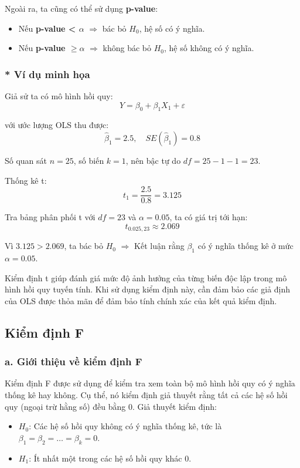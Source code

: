 Ngoài ra, ta cũng có thể sử dụng \textbf{p-value}:

\begin{itemize}
    \item Nếu \textbf{p-value < $\alpha$} $\Rightarrow$ bác bỏ $H_0$, hệ số có ý nghĩa.
    \item Nếu \textbf{p-value $\geq \alpha$} $\Rightarrow$ không bác bỏ $H_0$, hệ số không có ý nghĩa.
\end{itemize}

\subsubsection{* Ví dụ minh họa}

Giả sử ta có mô hình hồi quy:
\begin{equation}
    Y = \beta_0 + \beta_1 X_1 + \varepsilon
\end{equation}

với ước lượng OLS thu được:
\begin{equation}
    \hat{\beta}_1 = 2.5, \quad SE(\hat{\beta}_1) = 0.8
\end{equation}

Số quan sát $n = 25$, số biến $k = 1$, nên bậc tự do $df = 25 - 1 - 1 = 23$.

Thống kê t:
\begin{equation}
    t_1 = \frac{2.5}{0.8} = 3.125
\end{equation}

Tra bảng phân phối t với $df = 23$ và $\alpha = 0.05$, ta có giá trị tới hạn:
\begin{equation}
    t_{0.025,23} \approx 2.069
\end{equation}

Vì $3.125 > 2.069$, ta bác bỏ $H_0$ $\Rightarrow$ Kết luận rằng $\beta_1$ có ý nghĩa thống kê ở mức $\alpha = 0.05$.

Kiểm định t giúp đánh giá mức độ ảnh hưởng của từng biến độc lập trong mô hình hồi quy tuyến tính. Khi sử dụng kiểm định này, cần đảm bảo các giả định của OLS được thỏa mãn để đảm bảo tính chính xác của kết quả kiểm định.

\subsection{Kiểm định F}
\subsubsection{a. Giới thiệu về kiểm định F}
Kiểm định F được sử dụng để kiểm tra xem toàn bộ mô hình hồi quy có ý nghĩa thống kê hay không. Cụ thể, nó kiểm định giả thuyết rằng tất cả các hệ số hồi quy (ngoại trừ hằng số) đều bằng 0.
\newline
Giả thuyết kiểm định:
\begin{itemize}
    \item \( H_0 \): Các hệ số hồi quy không có ý nghĩa thống kê, tức là \( \beta_1 = \beta_2 = \dots = \beta_k = 0 \).
    \item \( H_1 \): Ít nhất một trong các hệ số hồi quy khác 0.
\end{itemize}

